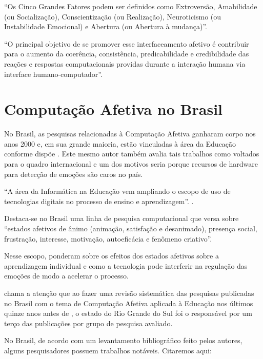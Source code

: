 \documentclass[
    12pt,                   %
    openright,              %
    oneside,                %
    a4paper,                %
    sumario=tradicional,    %
    english,                %
    brazil,                 %
    ]{abntex2}
\begin{document}
 ``Os Cinco Grandes Fatores podem ser definidos como Extroversão, Amabilidade (ou Socialização), Conscientização (ou Realização), Neuroticismo (ou Instabilidade Emocional) e Abertura (ou Abertura à mudança)''.  
 
 ``O principal objetivo de se promover esse interfaceamento afetivo é contribuir para o aumento da coerência, consistência, predicabilidade e credibilidade das reações e respostas computacionais providas durante a interação humana via interface humano-computador''. \cite{nunes2010computaccao}

\section{Computação Afetiva no Brasil}

No Brasil, as pesquisas relacionadas à Computação Afetiva ganharam corpo nos anos 2000 e, em sua grande maioria, estão vinculadas à área da Educação conforme dispõe . Este mesmo autor também avalia tais trabalhos como voltados para o quadro internacional e um dos motivos seria porque  recursos de hardware para detecção de emoções são caros no país.

``A área da Informática na Educação vem ampliando o escopo de uso de tecnologias digitais no processo de ensino e aprendizagem''. \cite{Rodrigues2017}.

Destaca-se no Brasil uma linha de pesquisa computacional que versa sobre ``estados afetivos de ânimo (animação, satisfação e desanimado), presença social, frustração, interesse, motivação, autoeficácia e fenômeno criativo''.\cite{Bercht2017}

Nesse escopo,  ponderam sobre os efeitos dos estados afetivos sobre a aprendizagem individual e como a tecnologia pode interferir na regulação das emoções de modo a acelerar o processo.

 chama a atenção que ao fazer uma revisão sistemática das pesquisas publicadas no Brasil com o tema de Computação Afetiva aplicada à Educação nos últimos quinze anos antes de \citeyear{morais2017}, o estado do Rio Grande do Sul foi o responsável por um terço das publicações por grupo de pesquisa avaliado.

No Brasil, de acordo com um levantamento bibliográfico feito pelos autores, alguns pesquisadores possuem trabalhos notáveis. Citaremos aqui:
\end{document}
